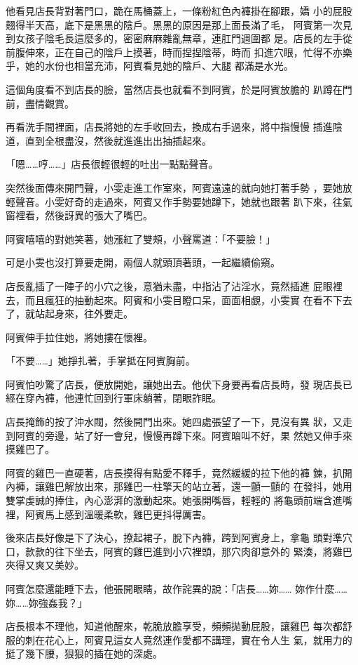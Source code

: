 他看見店長背對著門口，跪在馬桶蓋上，一條粉紅色內褲掛在腳跟，嬌
小的屁股翹得半天高，底下是黑黑的陰戶。黑黑的原因是那上面長滿了毛，
阿賓第一次見到女孩子陰毛長這麼多的，密密麻麻雜亂無章，連肛門週圍都
是。店長的左手從前腹伸來，正在自己的陰戶上摸著，時而捏捏陰蒂，時而
扣進穴眼，忙得不亦樂乎，她的水份也相當充沛，阿賓看見她的陰戶、大腿
都滿是水光。

這個角度看不到店長的臉，當然店長也就看不到阿賓，於是阿賓放膽的
趴蹲在門前，盡情觀賞。

再看洗手間裡面，店長將她的左手收回去，換成右手過來，將中指慢慢
插進陰道，直到全根盡沒，然後就進進出出抽插起來。

「嗯……哼……」店長很輕很輕的吐出一點點聲音。

突然後面傳來開門聲，小雯走進工作室來，阿賓遠遠的就向她打著手勢
，要她放輕聲音。小雯好奇的走過來，阿賓又作手勢要她蹲下，她就也跟著
趴下來，往氣窗裡看，然後訝異的張大了嘴巴。

阿賓嘻嘻的對她笑著，她漲紅了雙頰，小聲罵道：「不要臉！」

可是小雯也沒打算要走開，兩個人就頭頂著頭，一起繼續偷窺。

店長亂插了一陣子的小穴之後，意猶未盡，中指沾了沾淫水，竟然插進
屁眼裡去，而且瘋狂的抽動起來。阿賓和小雯目瞪口呆，面面相覷，小雯實
在看不下去了，就站起身來，往外要走。

阿賓伸手拉住她，將她摟在懷裡。

「不要……」她掙扎著，手掌抵在阿賓胸前。

阿賓怕吵驚了店長，便放開她，讓她出去。他伏下身要再看店長時，發
現店長已經在穿內褲，他連忙回到行軍床躺著，閉眼詐眠。

店長掩飾的按了沖水閥，然後開門出來。她四處張望了一下，見沒有異
狀，又走到阿賓的旁邊，站了好一會兒，慢慢再蹲下來。阿賓暗叫不好，果
然她又伸手來摸雞巴了。

阿賓的雞巴一直硬著，店長摸得有點愛不釋手，竟然緩緩的拉下他的褲
鍊，扒開內褲，讓雞巴解放出來，那雞巴一柱擎天的站立著，還一顫一顫的
在發抖，她用雙掌虔誠的捧住，內心澎湃的激動起來。她張開嘴唇，輕輕的
將龜頭前端含進嘴裡，阿賓馬上感到溫暖柔軟，雞巴更抖得厲害。

後來店長好像是下了決心，撩起裙子，脫下內褲，跨到阿賓身上，拿龜
頭對準穴口，款款的往下坐去，阿賓的雞巴進到小穴裡頭，那穴肉卻意外的
緊湊，將雞巴夾得又爽又美妙。

阿賓怎麼還能睡下去，他張開眼睛，故作詫異的說：「店長……妳……
妳作什麼……妳……妳強姦我？」

店長根本不理他，知道他醒來，乾脆放膽享受，頻頻拋動屁股，讓雞巴
每次都舒服的刺在花心上，阿賓見這女人竟然連作愛都不講理，實在令人生
氣，就用力的挺了幾下腰，狠狠的插在她的深處。

